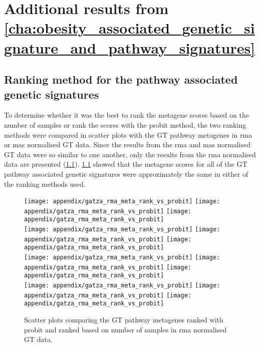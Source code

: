 
	\chapter{Additional results from \cref{cha:obesity_associated_genetic_signature_and_pathway_signatures}}
	\label{app:b}

	\section{Ranking method for the pathway associated genetic signatures}
	\label{sec:ranking_method_for_the_pathway_associated_genetic_signatures}

	To determine whether it was the best to rank the metagene scores based on the number of samples or rank the scores with the probit method, the two ranking methods were compared in scatter plots with the GT pathway metagenes in \gls{rma} or \gls{mas} normalised GT data.
	Since the results from the \gls{rma} and \gls{mas} normalised GT data were so similar to one another, only the results from the \gls{rma} normalised data are presented (\cref{fig:appendix/rank_scatter}).
	\cref{fig:appendix/rank_scatter} showed that the metagene scores for all of the GT pathway associated genetic signatures were approximately the same in either of the ranking methods used.

	\begin{figure}[htp!]
		\centering
		\texttt{[image: appendix/gatza\_rma\_meta\_rank\_vs\_probit]}
		\texttt{[image: appendix/gatza\_rma\_meta\_rank\_vs\_probit]}
		\texttt{[image: appendix/gatza\_rma\_meta\_rank\_vs\_probit]}\\
		\texttt{[image: appendix/gatza\_rma\_meta\_rank\_vs\_probit]}
		\texttt{[image: appendix/gatza\_rma\_meta\_rank\_vs\_probit]}
		\texttt{[image: appendix/gatza\_rma\_meta\_rank\_vs\_probit]}\\
		\texttt{[image: appendix/gatza\_rma\_meta\_rank\_vs\_probit]}
		\texttt{[image: appendix/gatza\_rma\_meta\_rank\_vs\_probit]}
		\texttt{[image: appendix/gatza\_rma\_meta\_rank\_vs\_probit]}\\
		\texttt{[image: appendix/gatza\_rma\_meta\_rank\_vs\_probit]}
		\texttt{[image: appendix/gatza\_rma\_meta\_rank\_vs\_probit]}
		\texttt{[image: appendix/gatza\_rma\_meta\_rank\_vs\_probit]}\\
		\caption[Comparison of the ranking methods for the pathway metagenes in the \acrshort{rma}-normalised GT data]{Scatter plots comparing the GT pathway metagenes ranked with probit and ranked based on number of samples in \gls{rma} normalised GT data. }
		\label{fig:appendix/rank_scatter}
	\end{figure}

